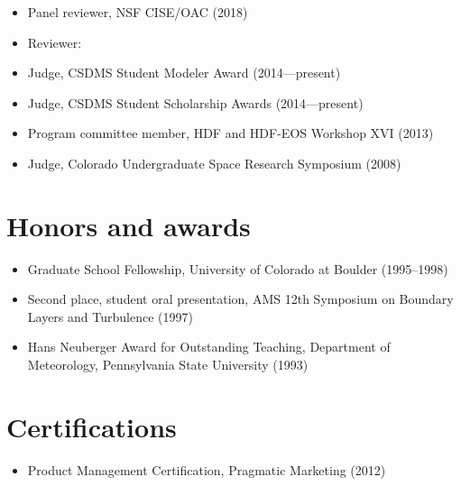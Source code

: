 \documentclass[letterpaper]{resume}
\begin{document}
\begin{itemize}

  \item Panel reviewer, NSF CISE/OAC (2018)

  \item Reviewer:

  \item Judge, CSDMS Student Modeler Award (2014---present)

  \item Judge, CSDMS Student Scholarship Awards (2014---present)

  \item Program committee member, HDF and HDF-EOS Workshop XVI (2013)

  \item Judge, Colorado Undergraduate Space Research Symposium (2008)

\end{itemize}


\section{Honors and awards}
\vspace{0.5em}

\begin{itemize}

  \item Graduate School Fellowship, University of Colorado at Boulder
    (1995--1998)

  \item Second place, student oral presentation, AMS 12th Symposium on
    Boundary Layers and Turbulence (1997)

  \item Hans Neuberger Award for Outstanding Teaching, Department of
    Meteorology, Pennsylvania State University (1993)

\end{itemize}


\section{Certifications}
\vspace{0.5em}

\begin{itemize}
  \item Product Management Certification, Pragmatic Marketing (2012)
\end{itemize}

\end{document}
